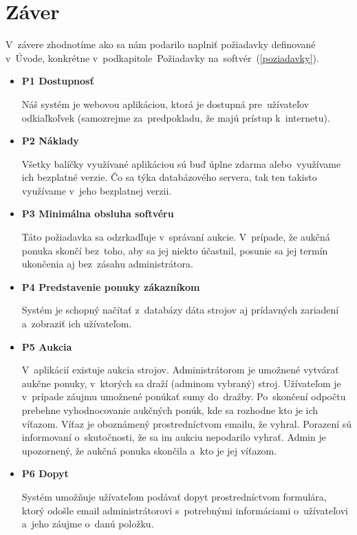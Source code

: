 \chapter*{Záver}

V~závere zhodnotíme ako sa nám podarilo naplniť požiadavky definované v~Úvode, konkrétne v~podkapitole~Požiadavky na~softvér~(\ref{poziadavky}).

\begin{itemize}
\item \textbf{P1 Dostupnosť}

Náš systém je webovou aplikáciou, ktorá je dostupná pre~užívateľov odkiaľkoľvek (samozrejme za~predpokladu, že majú prístup k~internetu).

\item \textbf{P2 Náklady}

Všetky balíčky využívané aplikáciou sú buď úplne zdarma alebo~využívame ich bezplatné verzie. Čo sa týka databázového servera, tak ten takisto využívame v~jeho bezplatnej verzii.

\item \textbf{P3 Minimálna obsluha softvéru}

Táto požiadavka sa odzrkadľuje v~správaní aukcie. V~prípade, že aukčná ponuka skončí bez~toho, aby sa jej niekto účastnil, posunie sa jej termín ukončenia aj bez~zásahu administrátora.

\item \textbf{P4 Predstavenie ponuky zákazníkom}

Systém je schopný načítať z~databázy dáta strojov aj prídavných zariadení a~zobraziť ich užívateľom.

\item \textbf{P5 Aukcia}

V~aplikácií existuje aukcia strojov. Administrátorom je umožnené vytvárať aukčne ponuky, v~ktorých sa draží (adminom vybraný) stroj. Užívateľom je v~prípade záujmu umožnené ponúkať sumy do~dražby. Po~skončení odpočtu prebehne vyhodnocovanie aukčných ponúk, kde sa rozhodne kto je ich víťazom. Víťaz je oboznámený prostredníctvom emailu, že vyhral. Porazení sú informovaní o~skutočnosti, že sa im aukciu nepodarilo vyhrať. Admin je upozornený, že aukčná ponuka skončila a~kto je jej víťazom.

\item \textbf{P6 Dopyt}

Systém umožňuje užívateľom podávať dopyt prostredníctvom formulára, ktorý odošle email administrátorovi s~potrebnými informáciami o~užívateľovi a~jeho záujme o~danú položku.


\end{itemize}
